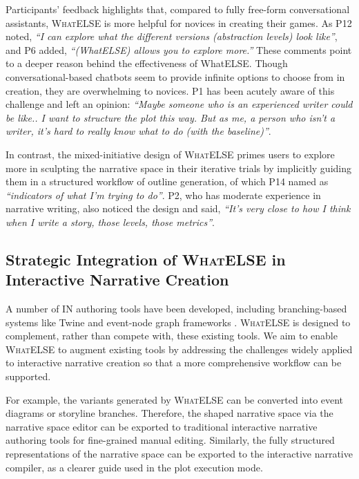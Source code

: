 Participants' feedback highlights that, compared to fully free-form conversational assistants, \textsc{WhatELSE} is more helpful for novices in creating their games. As P12 noted, {\it ``I can explore what the different versions (abstraction levels) look like''}, and P6 added, {\it ``(WhatELSE) allows you to explore more.''} These comments point to a deeper reason behind the effectiveness of {\sc WhatELSE}. Though conversational-based chatbots seem to provide infinite options to choose from in creation, they are overwhelming to novices. P1 has been acutely aware of this challenge and left an opinion: {\it ``Maybe someone who is an experienced writer could be like.. I want to structure the plot this way. But as me, a person who isn't a writer, it's hard to really know what to do (with the baseline)''}. 

In contrast, the mixed-initiative design of \textsc{WhatELSE} primes users to explore more in sculpting the narrative space in their iterative trials by implicitly guiding them in a structured workflow of outline generation, of which P14 named as {\it ``indicators of what I'm trying to do''}. P2, who has moderate experience in narrative writing, also noticed the design and said, {\it ``It's very close to how I think when I write a story, those levels, those metrics''}.


\subsection{Strategic Integration of \textsc{WhatELSE} in Interactive Narrative Creation}

A number of IN authoring tools have been developed, including branching-based systems like Twine \cite{friedhoff2013untangling} and event-node graph frameworks \cite{chung2024patchview}. \textsc{WhatELSE} is designed to complement, rather than compete with, these existing tools. We aim to enable \textsc{WhatELSE} to augment existing tools by addressing the challenges widely applied to interactive narrative creation so that a more comprehensive workflow can be supported.

For example, the variants generated by \textsc{WhatELSE} can be converted into event diagrams or storyline branches. Therefore, the shaped narrative space via the narrative space editor can be exported to traditional interactive narrative authoring tools for fine-grained manual editing. Similarly, the fully structured representations of the narrative space can be exported to the interactive narrative compiler, as a clearer guide used in the plot execution mode.

